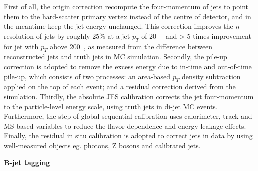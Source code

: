 First of all, the origin correction recompute the four-momentum of jets to point them to the hard-scatter primary vertex instead of the centre of detector, and in the meantime keep the jet energy unchanged.
This correction improves the $\eta$ resolution of jets by roughly 25\% at a jet $p_{T}$ of 20~\gev~ and > 5 times improvement for jet with $p_{T}$ above 200~\gev, 
as measured from the difference between reconstructed jets and truth jets in MC simulation.
Secondly, the pile-up correction is adopted to remove the excess energy due to in-time and out-of-time pile-up,
which consists of two processes: an area-based $p_{T}$ density subtraction applied on the top of each event; and a residual correction derived from the simulation.
Thirdly, the absolute JES calibration corrects the jet four-momentum to the particle-level energy scale, using truth jets in di-jet MC events.
Furthermore, the step of global sequential calibration uses calorimeter, track and MS-based variables to reduce the flavor dependence and energy leakage effects.
Finally, the residual in situ calibration is adopted to correct jets in data by using well-measured objects eg. photons, Z bosons and calibrated jets.

\textbf{B-jet tagging}

